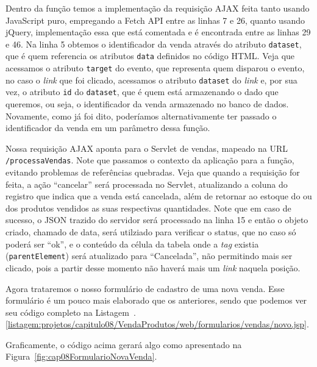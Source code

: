 Dentro da função temos a implementação da requisição AJAX feita tanto usando JavaScript puro, empregando a Fetch API entre as linhas 7 e 26, quanto usando jQuery, implementação essa que está comentada e é encontrada entre as linhas 29 e 46. Na linha 5 obtemos o identificador da venda através do atributo \texttt{dataset}, que é quem referencia os atributos \texttt{data} definidos no código HTML. Veja que acessamos o atributo \texttt{target} do evento, que representa quem disparou o evento, no caso o \textit{link} que foi clicado, acessamos o atributo \texttt{dataset} do \textit{link} e, por sua vez, o atributo \texttt{id} do \texttt{dataset}, que é quem está armazenando o dado que queremos, ou seja, o identificador da venda armazenado no banco de dados. Novamente, como já foi dito, poderíamos alternativamente ter passado o identificador da venda em um parâmetro dessa função.

Nossa requisição AJAX aponta para o Servlet de vendas, mapeado na URL\newline%
\texttt{/processaVendas}. Note que passamos o contexto da aplicação para a função, evitando problemas de referências quebradas. Veja que quando a requisição for feita, a ação ``cancelar'' será processada no Servlet, atualizando a coluna do registro que indica que a venda está cancelada, além de retornar ao estoque do ou dos produtos vendidos as suas respectivas quantidades. Note que em caso de sucesso, o JSON trazido do servidor será processado na linha 15 e então o objeto criado, chamado de data, será utilziado para verificar o status, que no caso só poderá ser ``ok'', e o conteúdo da célula da tabela onde a \textit{tag}  existia (\texttt{parentElement}) será atualizado para ``Cancelada'', não permitindo mais ser clicado, pois a partir desse momento não haverá mais um \textit{link} naquela posição.

Agora trataremos o nosso formulário de cadastro de uma nova venda. Esse formulário é um pouco mais elaborado que os anteriores, sendo que podemos ver seu código completo na Listagem~\thechapter.\ref{listagem:projetos/capitulo08/VendaProdutos/web/formularios/vendas/novo.jsp}.


Graficamente, o código acima gerará algo como apresentado na Figura~\ref{fig:cap08FormularioNovaVenda}.

